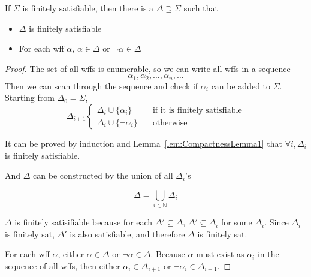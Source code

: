 \begin{lemma}
    \label{lem:CompactnessLemma2}
    If $\Sigma$ is finitely satisfiable, then there is a $\Delta \supseteq \Sigma$ such that
    \begin{itemize}
        \item $\Delta$ is finitely satisfiable
        \item For each wff $\alpha$, $\alpha\in\Delta$ or $\neg\alpha\in\Delta$
    \end{itemize}
\end{lemma}
\begin{proof}
    The set of all wffs is enumerable, so we can write all wffs in a sequence
    \[ \alpha_1, \alpha_2,\dots,\alpha_n,\dots \]
    Then we can scan through the sequence and check if $\alpha_i$ can be added to $\Sigma$. Starting from $\Delta_0 = \Sigma$,
    \[\Delta_{i+1}\begin{cases}
        \Delta_i \cup \{\alpha_i\} &\quad\text{if it is finitely satisfiable}\\
        \Delta_i \cup \{\neg \alpha_i\} &\quad \text{otherwise}
    \end{cases}\]

    It can be proved by induction and Lemma~\ref{lem:CompactnessLemma1} that $\forall i,\Delta_i$ is finitely satisfiable.

    And $\Delta$ can be constructed by the union of all $\Delta_i$'s

    \[ \Delta = \bigcup_{i\in\mathbb{N}} \Delta_i \]

    $\Delta$ is finitely satisifiable because for each $\Delta'\subseteq\Delta$, $\Delta'\subseteq\Delta_i$ for some $\Delta_i$. Since $\Delta_i$ is finitely sat, $\Delta'$ is also satisfiable, and therefore $\Delta$ is finitely sat.

    For each wff $\alpha$, either $\alpha\in\Delta$ or $\neg\alpha\in\Delta$. Because $\alpha$ must exist as $\alpha_i$ in the sequence of all wffs, then either $\alpha_i\in\Delta_{i+1}$ or $\neg\alpha_i\in\Delta_{i+1}$.
\end{proof}

